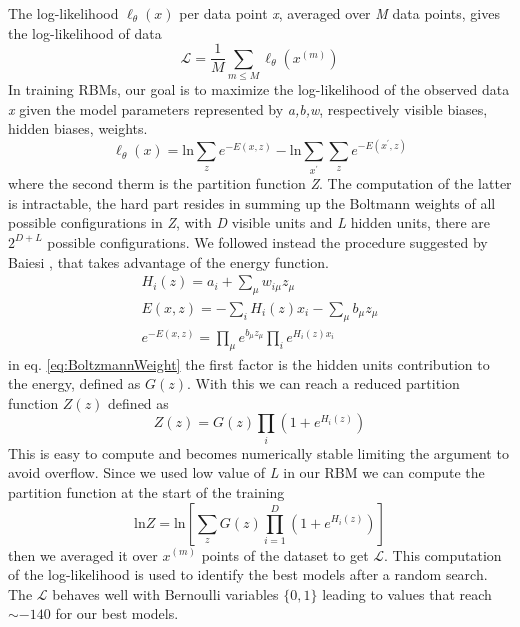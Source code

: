 \documentclass[prl,twocolumn]{revtex4-1}
\begin{document}
The log-likelihood $\ell_{\theta }\left( x \right)$ per data point \emph{x}, averaged over \emph{M} data points, gives the log-likelihood of data
\begin{equation}
\mathcal{L} = \frac{1}{M} \sum_{m\leq M}^{}{\ell_{\theta }\left( x^{\left( m \right)} \right)}
\end{equation}\cite{mehta}
In training RBMs, our goal is to maximize the log-likelihood of the observed data \emph{x} given the model parameters represented by \emph{a,b,w}, respectively visible biases, hidden biases, weights.
\begin{equation}
\ell_{\theta }\left( x \right) = \text{ln} \sum_{z}^{}{e^{-E\left( x,z \right)}} -\text{ln}\sum_{x^{\prime }}^{}{\sum_{z}^{}{e^{-E\left( x^{\prime},z \right)}}}
\end{equation}
where the second therm is the partition function \emph{Z}. The computation of the latter is intractable, the hard part resides in summing up the Boltmann weights of all possible configurations in \emph{Z}, with \emph{D} visible units and \emph{L} hidden units, there are $2^{D+L}$ possible configurations. We followed instead the procedure suggested by Baiesi \cite{baiesi}, that takes advantage of the energy function.
\begin{gather}
H_{i}\left( z \right) = a_{i}+ \sum_{\mu }^{}{w_{i\mu }z_{\mu }} \\
E\left( x,z \right) = - \sum_{i}^{}{H_{i}\left( z \right)x_{i}}-\sum_{\mu }^{}{b_{\mu }z_{\mu }}\\
e^{-E\left( x,z \right)} = \prod_\mu  e^{b_{\mu }z_{\mu }}\prod_{i}e^{H_{i}\left( z \right)x_{i}}\label{eq:BoltzmannWeight}
\end{gather}
in eq. \ref{eq:BoltzmannWeight} the first factor is the hidden units contribution to the energy, defined as $G\left( z \right)$. With this we can reach a reduced partition function $Z\left( z \right)$ defined as
\begin{equation}
Z\left( z \right) = G\left( z \right) \prod_{i}\left( 1+e^{H_{i}\left( z \right)} \right)
\end{equation}
This is easy to compute and becomes numerically stable limiting the argument to avoid overflow. Since we used low value of \emph{L} in our RBM we can compute the partition function at the start of the training
\begin{equation}
\text{ln}Z = \text{ln}\left[ \sum_{z}^{}{G\left( z \right) \prod_{i=1}^{D} \left( 1+e^{H_{i}\left( z \right)} \right)} \right]	
\end{equation}
then we averaged it over $x^{\left( m \right)}$ points of the dataset to get $\mathcal{L}$. This computation of the log-likelihood is used to identify the best models after a random search. The $\mathcal{L}$ behaves well with Bernoulli variables $\{0,1\}$ leading to values that reach $\sim -140$ for our best models.
    
\end{document}
